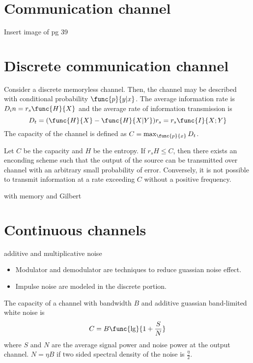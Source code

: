 \section{Communication channel}
Insert image of pg 39
\section{Discrete communication channel}
Consider a discrete memoryless channel. Then, the channel may be described with conditional probability \(\func{p}{y|x}\). The average information rate is \(D_in = r_s \func{H}{X} \) and the average rate of information transmission is 
\begin{equation*}
    D_t = (\func{H}{X} - \func{H}{X|Y}) r_s = r_s \func{I}{X;Y}
\end{equation*}
The capacity of the channel is defined as \(C = \max_{\func{p}{x}} D_t\).

\begin{theorem}
    Let \(C\) be the capacity and \(H\) be the entropy. If \(r_sH \leq C\), then there exists an enconding scheme such that the output of the source can be transmitted over channel with an arbitrary small probability of error. Conversely, it is not possible to transmit information at a rate exceeding \(C\) without a positive frequency.
\end{theorem}

\begin{remark}
    with memory and Gilbert
\end{remark}

\section{Continuous channels}
\begin{remark}
    additive and multiplicative noise
\end{remark}

\begin{itemize}
    \item Modulator and demodulator are techniques to reduce guassian noise effect.
    \item Impulse noise are modeled in the discrete portion.
\end{itemize}

\begin{theorem}
    The capacity of a channel with bandwidth \(B\) and additive guassian band-limited white noise is 
    \begin{equation*}
        C = B \func{\lg}{1 + \dfrac{S}{N}}
    \end{equation*}
    where \(S\) and \(N\) are the average signal power and noise power at the output channel. \(N = \eta B\) if two sided spectral density of the noise is \(\frac{\eta}{2}\). 
\end{theorem}

